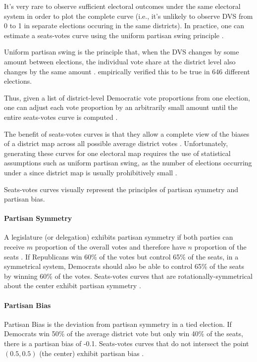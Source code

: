 It's very rare to observe sufficient electoral outcomes under the same electoral system in order to plot the complete curve (i.e., it's unlikely to observe DVS from 0 to 1 in separate elections occuring in the same districts). In practice, one can estimate a seats-votes curve using the uniform partisan swing principle \parencite{tufte1973}.

Uniform partisan swing is the principle that, when the DVS changes by some amount between elections, the individual vote share at the district level also changes by the same amount \parencite{tufte1973}. \textcite{katz2020} empirically verified this to be true in 646 different elections. 

Thus, given a list of district-level Democratic vote proportions from one election, one can adjust each vote proportion by an arbitrarily small amount until the entire seats-votes curve is computed \parencite{katz2020}.

The benefit of seats-votes curves is that they allow a complete view of the biases of a district map across all possible average district votes \parencite{gelman1994}. Unfortunately, generating these curves for one electoral map requires the use of statistical assumptions such as uniform partisan swing, as the number of elections occurring under a since district map is usually prohibitively small \parencite{warrington2018}.

Seats-votes curves visually represent the principles of partisan symmetry and partisan bias.

\paragraph{Partisan Symmetry}

A legislature (or delegation) exhibits partisan symmetry if both parties can receive $m$ proportion of the overall votes and therefore have $n$ proportion of the seats \parencite{katz2020}. If Republicans win 60\% of the votes but control 65\% of the seats, in a symmetrical system, Democrats should also be able to control 65\% of the seats by winning 60\% of the votes. Seats-votes curves that are rotationally-symmetrical about the center exhibit partisan symmetry \parencite{tufte1973}.

\paragraph{Partisan Bias}
\label{sec:bias}

Partisan Bias is the deviation from partisan symmetry in a tied election. If Democrats win 50\% of the average district vote but only win 40\% of the seats, there is a partisan bias of -0.1. Seats-votes curves that do not intersect the point $(0.5, 0.5)$ (the center) exhibit partisan bias \parencite{katz2020}.

